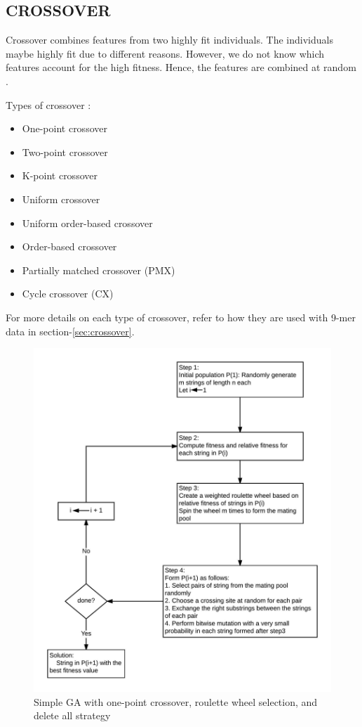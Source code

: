 \documentclass[12pt,a4paper]{article}
\begin{document}
	\subsection{CROSSOVER}
	Crossover combines features from two highly fit individuals. The individuals maybe highly fit due to different reasons. However, we do not know which features account for the high fitness. Hence, the features are combined at random \cite{goldberg}.  \par
	Types of crossover \cite{goldberg}:
	\begin{itemize}
	\item One-point crossover
	\item Two-point crossover
	\item K-point crossover
	\item Uniform crossover
	\item Uniform order-based crossover
	\item Order-based crossover
	\item Partially matched crossover (PMX)
	\item Cycle crossover (CX)
	\end{itemize}

	For more details on each type of crossover, refer to how they are used with 9-mer data in section-\ref{sec:crossover}.

	\begin{figure}[H]
		\includegraphics[width=\textwidth,height=\textheight]{"GA-block2-algo"}
		\caption{Simple GA with one-point crossover, roulette wheel selection, and delete all strategy}
		\centering
	\end{figure}
\end{document}
